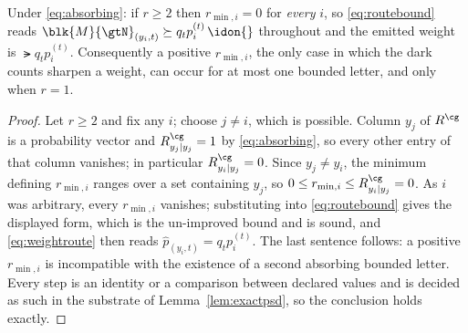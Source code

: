 
\begin{corollary}
\label{cor:oneabsorbing}
Under \eqref{eq:absorbing}: if $r\ge2$ then $r_{\min,i}=0$ for \emph{every}
$i$, so \eqref{eq:routebound} reads
$\blk{M}{\gtN}_{(y_i,t)}\succeq q_tp^{(t)}_i\,\idon{}$ throughout and the
emitted weight is $\lat{q_tp^{(t)}_i}$. Consequently a positive
$r_{\min,i}$, the only case in which the dark counts sharpen a weight, can
occur for at most one bounded letter, and only when $r=1$.
\end{corollary}

\begin{proof}
Let $r\ge2$ and fix any $i$; choose $j\ne i$, which is possible. Column $y_j$
of $R^{\cg}$ is a probability vector and $R^{\cg}_{y_j|y_j}=1$ by
\eqref{eq:absorbing}, so every other entry of that column vanishes; in
particular $R^{\cg}_{y_i|y_j}=0$. Since $y_j\ne y_i$, the minimum defining
$r_{\min,i}$ ranges over a set containing $y_j$, so
$0\le r_{\min,i}\le R^{\cg}_{y_i|y_j}=0$. As $i$ was arbitrary, every
$r_{\min,i}$ vanishes; substituting into \eqref{eq:routebound} gives the
displayed form, which is the un-improved bound and is sound, and
\eqref{eq:weightroute} then reads $\hat p_{(y_i,t)}=q_tp^{(t)}_i$. The last
sentence follows: a positive $r_{\min,i}$ is incompatible with the existence
of a second absorbing bounded letter. Every step is an identity or a
comparison between declared values and is decided as such in the substrate of
Lemma~\ref{lem:exactpsd}, so the conclusion holds exactly.
\end{proof}
